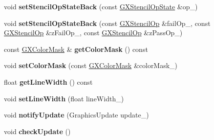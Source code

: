 \begin{DoxyCompactItemize}
\item 
void {\bfseries set\+Stencil\+Op\+State\+Back} (const \hyperlink{class_magnum_1_1_g_x_stencil_op_state}{G\+X\+Stencil\+Op\+State} \&op\+\_\+)\hypertarget{class_magnum_1_1_g_x_context_a2446b018020d4dc0e3f21888fdd87c96}{}\label{class_magnum_1_1_g_x_context_a2446b018020d4dc0e3f21888fdd87c96}

\item 
void {\bfseries set\+Stencil\+Op\+State\+Back} (const \hyperlink{class_magnum_1_1_g_x_stencil_op}{G\+X\+Stencil\+Op} \&fail\+Op\+\_\+, const \hyperlink{class_magnum_1_1_g_x_stencil_op}{G\+X\+Stencil\+Op} \&z\+Fail\+Op\+\_\+, const \hyperlink{class_magnum_1_1_g_x_stencil_op}{G\+X\+Stencil\+Op} \&z\+Pass\+Op\+\_\+)\hypertarget{class_magnum_1_1_g_x_context_affa09eb1b7fffd6feb54c9c3cb334d30}{}\label{class_magnum_1_1_g_x_context_affa09eb1b7fffd6feb54c9c3cb334d30}

\item 
const \hyperlink{class_magnum_1_1_g_x_color_mask}{G\+X\+Color\+Mask} \& {\bfseries get\+Color\+Mask} () const \hypertarget{class_magnum_1_1_g_x_context_a5752edc69ea61702a007215e32f266e5}{}\label{class_magnum_1_1_g_x_context_a5752edc69ea61702a007215e32f266e5}

\item 
void {\bfseries set\+Color\+Mask} (const \hyperlink{class_magnum_1_1_g_x_color_mask}{G\+X\+Color\+Mask} \&color\+Mask\+\_\+)\hypertarget{class_magnum_1_1_g_x_context_a16dfc4c6be174f066556863cd0ca9f30}{}\label{class_magnum_1_1_g_x_context_a16dfc4c6be174f066556863cd0ca9f30}

\item 
float {\bfseries get\+Line\+Width} () const \hypertarget{class_magnum_1_1_g_x_context_a236e28580c69e09c56b174930446f534}{}\label{class_magnum_1_1_g_x_context_a236e28580c69e09c56b174930446f534}

\item 
void {\bfseries set\+Line\+Width} (float line\+Width\+\_\+)\hypertarget{class_magnum_1_1_g_x_context_a36b5a7f559e2d38a98e6def3ede9e640}{}\label{class_magnum_1_1_g_x_context_a36b5a7f559e2d38a98e6def3ede9e640}

\item 
void {\bfseries notify\+Update} (Graphics\+Update update\+\_\+)\hypertarget{class_magnum_1_1_g_x_context_a183c907d8096fa05d3805ba8223c84ad}{}\label{class_magnum_1_1_g_x_context_a183c907d8096fa05d3805ba8223c84ad}

\item 
void {\bfseries check\+Update} ()\hypertarget{class_magnum_1_1_g_x_context_a6729135b8e8d7adda3e5f2503bc84cbc}{}\label{class_magnum_1_1_g_x_context_a6729135b8e8d7adda3e5f2503bc84cbc}

\end{DoxyCompactItemize}
